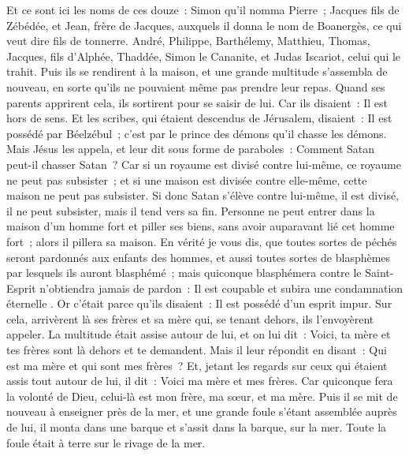 \begin{multicols}{2}
Et ce sont ici les noms de ces douze~: Simon qu'il nomma Pierre~;
Jacques fils de Zébédée, et Jean, frère de Jacques, auxquels il donna le nom de Boanergès, ce qui veut dire fils de tonnerre.
André, Philippe, Barthélemy, Matthieu, Thomas, Jacques, fils d'Alphée, Thaddée, Simon le Cananite,
et Judas Iscariot, celui qui le trahit.
Puis ils se rendirent à la maison, et une grande multitude s'assembla de nouveau, en sorte qu'ils ne pouvaient même pas prendre leur repas.
Quand ses parents apprirent cela, ils sortirent pour se saisir de lui. Car ils disaient~: Il est hors de sens.
Et les scribes, qui étaient descendus de Jérusalem, disaient~: Il est possédé par Béelzébul~; c'est par le prince des démons qu'il chasse les démons.
Mais Jésus les appela, et leur dit sous forme de paraboles~: Comment Satan peut-il chasser Satan~?
Car si un royaume est divisé contre lui-même, ce royaume ne peut pas subsister~;
et si une maison est divisée contre elle-même, cette maison ne peut pas subsister.
Si donc Satan s'élève contre lui-même, il est divisé, il ne peut subsister, mais il tend vers sa fin.
Personne ne peut entrer dans la maison d'un homme fort et piller ses biens, sans avoir auparavant lié cet homme fort~; alors il pillera sa maison.
En vérité je vous dis, que toutes sortes de péchés seront pardonnés aux enfants des hommes, et aussi toutes sortes de blasphèmes par lesquels ils auront blasphémé~;
mais quiconque blasphémera contre le Saint-Esprit n'obtiendra jamais de pardon~: Il est coupable et subira une condamnation éternelle .
Or c'était parce qu'ils disaient~: Il est possédé d'un esprit impur.
Sur cela, arrivèrent là ses frères et sa mère qui, se tenant dehors, ils l'envoyèrent appeler. La multitude était assise autour de lui,
et on lui dit~: Voici, ta mère et tes frères sont là dehors et te demandent.
Mais il leur répondit en disant~: Qui est ma mère et qui sont mes frères~?
Et, jetant les regards sur ceux qui étaient assis tout autour de lui, il dit~: Voici ma mère et mes frères.
Car quiconque fera la volonté de Dieu, celui-là est mon frère, ma sœur, et ma mère.
\VerseOne{}Puis il se mit de nouveau à enseigner près de la mer, et une grande foule s'étant assemblée auprès de lui, il monta dans une barque et s'assit dans la barque, sur la mer. Toute la foule était à terre sur le rivage de la mer.

\end{multicols}
